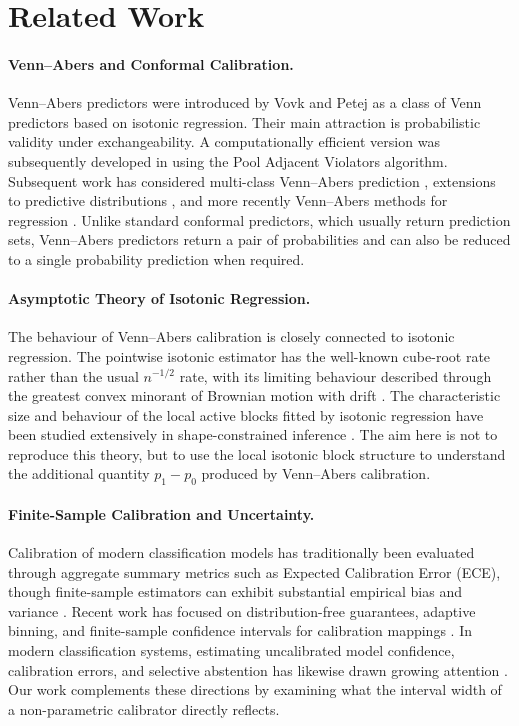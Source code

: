 \documentclass[11pt]{article}
\begin{document}
\section{Related Work}
	\label{sec:related}

	\paragraph{Venn--Abers and Conformal Calibration.}
	Venn--Abers predictors were introduced by Vovk and Petej \cite{vovk2014} as a class of Venn predictors based on isotonic regression. Their main attraction is probabilistic validity under exchangeability. A computationally efficient version was subsequently developed in \cite{vovk2015} using the Pool Adjacent Violators algorithm. Subsequent work has considered multi-class Venn--Abers prediction \cite{manokhin2017multiclass}, extensions to predictive distributions \cite{nouretdinov2018ivapdist}, and more recently Venn--Abers methods for regression \cite{petej2026regressors}. Unlike standard conformal predictors, which usually return prediction sets, Venn--Abers predictors return a pair of probabilities and can also be reduced to a single probability prediction when required.

	\paragraph{Asymptotic Theory of Isotonic Regression.}
	The behaviour of Venn--Abers calibration is closely connected to isotonic regression. The pointwise isotonic estimator has the well-known cube-root rate rather than the usual $n^{-1/2}$ rate, with its limiting behaviour described through the greatest convex minorant of Brownian motion with drift \cite{groeneboom1985}. The characteristic size and behaviour of the local active blocks fitted by isotonic regression have been studied extensively in shape-constrained inference \cite{wright1981, robertson1988, groeneboom2014, han2022}. The aim here is not to reproduce this theory, but to use the local isotonic block structure to understand the additional quantity $p_1-p_0$ produced by Venn--Abers calibration.

	\paragraph{Finite-Sample Calibration and Uncertainty.}
	Calibration of modern classification models has traditionally been evaluated through aggregate summary metrics such as Expected Calibration Error (ECE), though finite-sample estimators can exhibit substantial empirical bias and variance \cite{kumar2019, vaicenavicius2019}. Recent work has focused on distribution-free guarantees, adaptive binning, and finite-sample confidence intervals for calibration mappings \cite{gupta2020}. In modern classification systems, estimating uncalibrated model confidence, calibration errors, and selective abstention has likewise drawn growing attention \cite{kumar2019}. Our work complements these directions by examining what the interval width of a non-parametric calibrator directly reflects.
\end{document}

